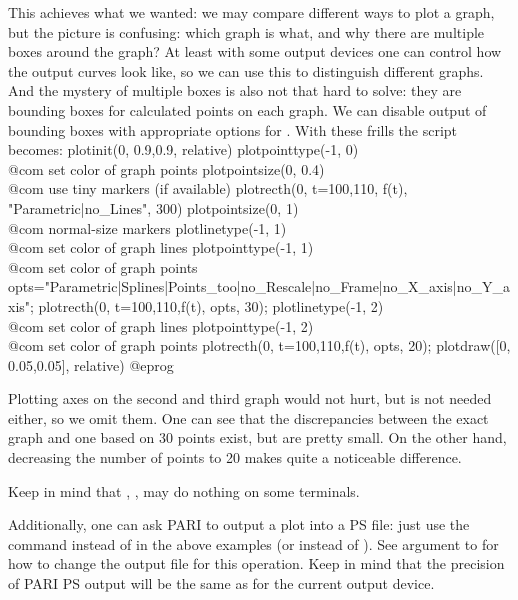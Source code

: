 This achieves what we wanted: we may compare different ways to plot a graph,
but the picture is confusing: which graph is what, and why there are multiple
boxes around the graph?  At least with some output devices one can control
how the output curves look like, so we can use this to distinguish different
graphs.  And the mystery of multiple boxes is also not that hard to solve:
they are bounding boxes for calculated points on each graph.  We can disable
output of bounding boxes with appropriate options for .
With these frills the script becomes:
\bprog
plotinit(0, 0.9,0.9, relative)
plotpointtype(-1, 0)                \\@com set color of graph points
plotpointsize(0, 0.4)               \\@com use tiny markers (if available)
plotrecth(0, t=100,110, f(t), "Parametric|no_Lines", 300)
plotpointsize(0, 1)                 \\@com normal-size markers
plotlinetype(-1, 1)                 \\@com set color of graph lines
plotpointtype(-1, 1)                \\@com set color of graph points
opts="Parametric|Splines|Points_too|no_Rescale|no_Frame|no_X_axis|no_Y_axis";
plotrecth(0, t=100,110,f(t), opts, 30);
plotlinetype(-1, 2)                 \\@com set color of graph lines
plotpointtype(-1, 2)                \\@com set color of graph points
plotrecth(0, t=100,110,f(t), opts, 20);
plotdraw([0, 0.05,0.05], relative)
@eprog

\noindent Plotting axes on the second and third graph would not hurt, but
is not needed either, so we omit them.  One can see that the discrepancies
between the exact graph and one based on 30 points exist, but are pretty
small.  On the other hand, decreasing the number of points to 20 makes
quite a noticeable difference.

Keep in mind that , ,
 may do nothing on some terminals.

Additionally, one can ask PARI to output a plot into a PS file: just
use the command  instead of  in the above examples
(or  instead of ).  See  argument
to  for how to change the output file for this operation.  Keep
in mind that the precision of PARI PS output will be the same as for the
current output device.

